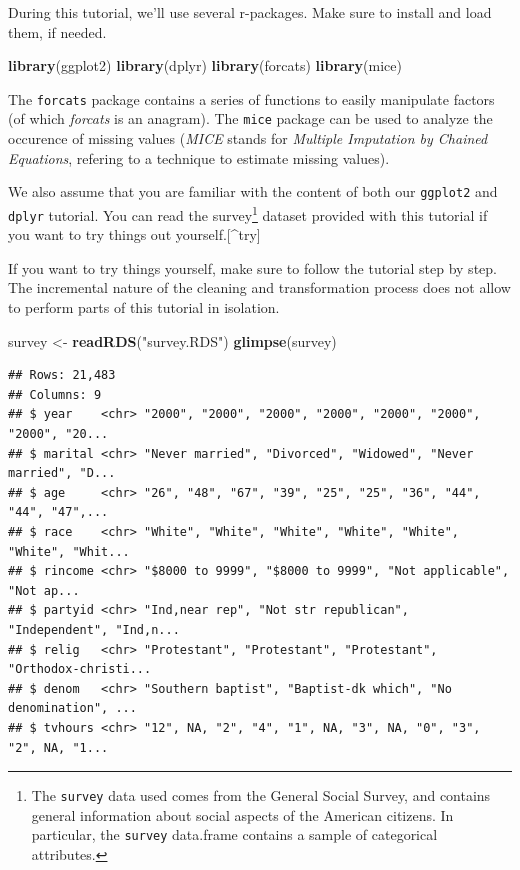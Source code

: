 \documentclass[]{tufte-book}
\newenvironment{Shaded}{}{}
\newcommand{\KeywordTok}[1]{\textcolor[rgb]{0.00,0.44,0.13}{\textbf{#1}}}
\newcommand{\NormalTok}[1]{#1}
\newcommand{\StringTok}[1]{\textcolor[rgb]{0.25,0.44,0.63}{#1}}
\begin{document}
During this tutorial, we'll use several r-packages. Make sure to install and load them, if needed.

\begin{Shaded}
\begin{Highlighting}[]
\KeywordTok{library}\NormalTok{(ggplot2)}
\KeywordTok{library}\NormalTok{(dplyr)}
\KeywordTok{library}\NormalTok{(forcats)}
\KeywordTok{library}\NormalTok{(mice)}
\end{Highlighting}
\end{Shaded}

The \texttt{forcats} package contains a series of functions to easily manipulate factors (of which \emph{forcats} is an anagram). The \texttt{mice} package can be used to analyze the occurence of missing values (\emph{MICE} stands for \emph{Multiple Imputation by Chained Equations}, refering to a technique to estimate missing values).

We also assume that you are familiar with the content of both our \texttt{ggplot2} and \texttt{dplyr} tutorial. You can read the survey\footnote{The \texttt{survey} data used comes from the General Social Survey, and contains general information about social aspects of the American citizens. In particular, the \texttt{survey} data.frame contains a sample of categorical attributes.} dataset provided with this tutorial if you want to try things out yourself.{[}\^{}try{]}

If you want to try things yourself, make sure to follow the tutorial step by step. The incremental nature of the cleaning and transformation process does not allow to perform parts of this tutorial in isolation.

\begin{Shaded}
\begin{Highlighting}[]
\NormalTok{survey <-}\StringTok{ }\KeywordTok{readRDS}\NormalTok{(}\StringTok{"survey.RDS"}\NormalTok{)}
\KeywordTok{glimpse}\NormalTok{(survey)}
\end{Highlighting}
\end{Shaded}

\begin{verbatim}
## Rows: 21,483
## Columns: 9
## $ year    <chr> "2000", "2000", "2000", "2000", "2000", "2000", "2000", "20...
## $ marital <chr> "Never married", "Divorced", "Widowed", "Never married", "D...
## $ age     <chr> "26", "48", "67", "39", "25", "25", "36", "44", "44", "47",...
## $ race    <chr> "White", "White", "White", "White", "White", "White", "Whit...
## $ rincome <chr> "$8000 to 9999", "$8000 to 9999", "Not applicable", "Not ap...
## $ partyid <chr> "Ind,near rep", "Not str republican", "Independent", "Ind,n...
## $ relig   <chr> "Protestant", "Protestant", "Protestant", "Orthodox-christi...
## $ denom   <chr> "Southern baptist", "Baptist-dk which", "No denomination", ...
## $ tvhours <chr> "12", NA, "2", "4", "1", NA, "3", NA, "0", "3", "2", NA, "1...
\end{verbatim}
\end{document}
